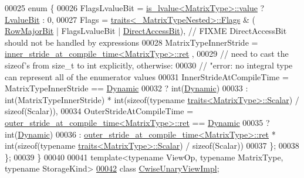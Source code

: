 \begin{DoxyCode}
00025   \textcolor{keyword}{enum} \{
00026     FlagsLvalueBit = \hyperlink{struct_eigen_1_1internal_1_1is__lvalue}{is\_lvalue<MatrixType>::value} ? 
      \hyperlink{group__flags_gae2c323957f20dfdc6cb8f44428eaec1a}{LvalueBit} : 0,
00027     Flags = \hyperlink{struct_eigen_1_1internal_1_1traits}{traits<\_MatrixTypeNested>::Flags} & (
      \hyperlink{group__flags_gae4f56c2a60bbe4bd2e44c5b19cbe8762}{RowMajorBit} | FlagsLvalueBit | \hyperlink{group__flags_gabf1e9d0516a933445a4c307ad8f14915}{DirectAccessBit}), \textcolor{comment}{// FIXME DirectAccessBit should
       not be handled by expressions}
00028     MatrixTypeInnerStride =  \hyperlink{struct_eigen_1_1internal_1_1inner__stride__at__compile__time}{inner\_stride\_at\_compile\_time<MatrixType>::ret}
      ,
00029     \textcolor{comment}{// need to cast the sizeof's from size\_t to int explicitly, otherwise:}
00030     \textcolor{comment}{// "error: no integral type can represent all of the enumerator values}
00031     InnerStrideAtCompileTime = MatrixTypeInnerStride == \hyperlink{namespace_eigen_ad81fa7195215a0ce30017dfac309f0b2}{Dynamic}
00032                              ? \textcolor{keywordtype}{int}(\hyperlink{namespace_eigen_ad81fa7195215a0ce30017dfac309f0b2}{Dynamic})
00033                              : int(MatrixTypeInnerStride) * int(\textcolor{keyword}{sizeof}(\textcolor{keyword}{typename} 
      \hyperlink{struct_eigen_1_1internal_1_1traits}{traits<MatrixType>::Scalar}) / \textcolor{keyword}{sizeof}(Scalar)),
00034     OuterStrideAtCompileTime = \hyperlink{struct_eigen_1_1internal_1_1outer__stride__at__compile__time}{outer\_stride\_at\_compile\_time<MatrixType>::ret}
       == \hyperlink{namespace_eigen_ad81fa7195215a0ce30017dfac309f0b2}{Dynamic}
00035                              ? int(\hyperlink{namespace_eigen_ad81fa7195215a0ce30017dfac309f0b2}{Dynamic})
00036                              : \hyperlink{struct_eigen_1_1internal_1_1outer__stride__at__compile__time}{outer\_stride\_at\_compile\_time<MatrixType>::ret}
       * int(\textcolor{keyword}{sizeof}(\textcolor{keyword}{typename} \hyperlink{struct_eigen_1_1internal_1_1traits}{traits<MatrixType>::Scalar}) / \textcolor{keyword}{sizeof}(Scalar))
00037   \};
00038 \};
00039 \}
00040 
00041 \textcolor{keyword}{template}<\textcolor{keyword}{typename} ViewOp, \textcolor{keyword}{typename} MatrixType, \textcolor{keyword}{typename} StorageKind>
\hyperlink{class_eigen_1_1_cwise_unary_view_impl}{00042} \textcolor{keyword}{class }\hyperlink{class_eigen_1_1_cwise_unary_view_impl}{CwiseUnaryViewImpl};

\end{DoxyCode}
